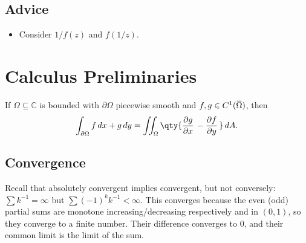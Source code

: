 \hypertarget{advice}{%
\subsection{Advice}\label{advice}}

\begin{itemize}
\tightlist
\item
  Consider \(1/f(z)\) and \(f(1/z)\).
\end{itemize}

\hypertarget{calculus-preliminaries}{%
\section{Calculus Preliminaries}\label{calculus-preliminaries}}

\begin{theorem}

\end{theorem}

\begin{theorem}

\end{theorem}

\begin{theorem}

If \(\Omega \subseteq {\mathbb{C}}\) is bounded with
\({{\partial}}\Omega\) piecewise smooth and
\(f, g\in C^1(\mkern 1.5mu\overline{\mkern-1.5mu\Omega\mkern-1.5mu}\mkern 1.5mu)\),
then
\begin{align*}\int_{{{\partial}}\Omega} f\, dx + g\, dy = \iint_{\Omega} \qty{ {\frac{\partial g}{\partial x}\,} - {\frac{\partial f}{\partial y}\,} } \, dA.\end{align*}

\end{theorem}

\hypertarget{convergence}{%
\subsection{Convergence}\label{convergence}}

\begin{remark}

Recall that absolutely convergent implies convergent, but not
conversely: \(\sum k^{-1}= \infty\) but \(\sum (-1)^k k^{-1}< \infty\).
This converges because the even (odd) partial sums are monotone
increasing/decreasing respectively and in \((0, 1)\), so they converge
to a finite number. Their difference converges to 0, and their common
limit is the limit of the sum.

\end{remark}

